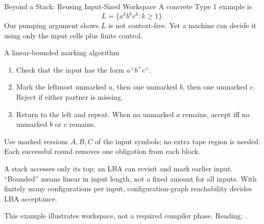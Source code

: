 \documentclass[10pt]{beamer}
\begin{document}
\begin{frame}{Beyond a Stack: Reusing Input-Sized Workspace}
  \small
  A concrete Type 1 example is
  \[
    L=\{a^k b^k c^k:k\ge1\}.
  \]
  Our pumping argument shows $L$ is not context-free. Yet a machine can
  decide it using only the input cells plus finite control.
  \begin{block}{A linear-bounded marking algorithm}
    \begin{enumerate}
      \item Check that the input has the form $a^+b^+c^+$.
      \pause
      \item Mark the leftmost unmarked $a$, then one unmarked $b$, then one
        unmarked $c$. Reject if either partner is missing.
      \pause
      \item Return to the left and repeat. When no unmarked $a$ remains,
        accept iff no unmarked $b$ or $c$ remains.
    \end{enumerate}
  \end{block}
  Use marked versions $A,B,C$ of the input symbols; no extra tape region
  is needed. Each successful round removes one obligation from each block.
  \pause
  \par
  A stack accesses only its top; an LBA can revisit and mark earlier input.
  ``Bounded'' means linear in input length, not a fixed amount for all inputs.
  With finitely many configurations per input, configuration-graph
  reachability decides LBA acceptance.
  \par
  {\scriptsize This example illustrates workspace, not a required compiler
  phase. Reading: \cite{linz,hopcroft}.}
\end{frame}
\end{document}
